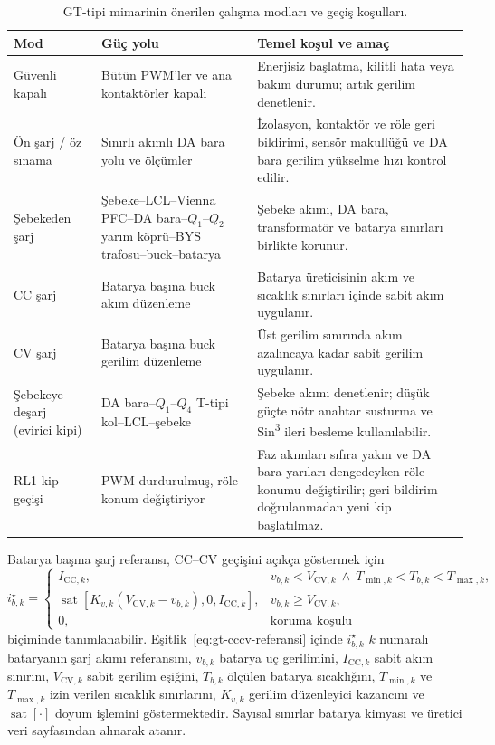 \begin{table}[H]
  \centering
  \caption{GT-tipi mimarinin önerilen çalışma modları ve geçiş koşulları.}
  \label{tab:gt-calisma-modlari}
  \small
  \begin{tabularx}{\textwidth}{@{}p{}p{}X@{}}
    \toprule
    Mod & Güç yolu & Temel koşul ve amaç \\
    \midrule
    Güvenli kapalı & Bütün PWM'ler ve ana kontaktörler kapalı & Enerjisiz başlatma, kilitli hata veya bakım durumu; artık gerilim denetlenir. \\
    Ön şarj / öz sınama & Sınırlı akımlı DA bara yolu ve ölçümler & İzolasyon, kontaktör ve röle geri bildirimi, sensör makullüğü ve DA bara gerilim yükselme hızı kontrol edilir. \\
    Şebekeden şarj & Şebeke--LCL--Vienna PFC--DA bara--$Q_1$--$Q_2$ yarım köprü--BYS trafosu--buck--batarya & Şebeke akımı, DA bara, transformatör ve batarya sınırları birlikte korunur. \\
    CC şarj & Batarya başına buck akım düzenleme & Batarya üreticisinin akım ve sıcaklık sınırları içinde sabit akım uygulanır. \\
    CV şarj & Batarya başına buck gerilim düzenleme & Üst gerilim sınırında akım azalıncaya kadar sabit gerilim uygulanır. \\
    Şebekeye deşarj (evirici kipi) & DA bara--$Q_1$--$Q_4$ T-tipi kol--LCL--şebeke & Şebeke akımı denetlenir; düşük güçte nötr anahtar susturma ve Sin\textsuperscript{3} ileri besleme kullanılabilir. \\
    RL1 kip geçişi & PWM durdurulmuş, röle konum değiştiriyor & Faz akımları sıfıra yakın ve DA bara yarıları dengedeyken röle konumu değiştirilir; geri bildirim doğrulanmadan yeni kip başlatılmaz. \\
    \bottomrule
  \end{tabularx}
\end{table}

Batarya başına şarj referansı, CC--CV geçişini açıkça göstermek için
\begin{equation}
  i_{b,k}^{\star}=
  \begin{cases}
    I_{\mathrm{CC},k}, & v_{b,k}<V_{\mathrm{CV},k}\ \land\ T_{\min,k}<T_{b,k}<T_{\max,k},\\
    \operatorname{sat}\!\left[K_{v,k}\left(V_{\mathrm{CV},k}-v_{b,k}\right),0,I_{\mathrm{CC},k}\right],
      & v_{b,k}\geq V_{\mathrm{CV},k},\\
    0, & \text{koruma koşulu}
  \end{cases}
  \label{eq:gt-cccv-referansi}
\end{equation}
biçiminde tanımlanabilir. Eşitlik~\eqref{eq:gt-cccv-referansi} içinde $i_{b,k}^{\star}$ $k$ numaralı bataryanın şarj akımı referansını, $v_{b,k}$ batarya uç gerilimini, $I_{\mathrm{CC},k}$ sabit akım sınırını, $V_{\mathrm{CV},k}$ sabit gerilim eşiğini, $T_{b,k}$ ölçülen batarya sıcaklığını, $T_{\min,k}$ ve $T_{\max,k}$ izin verilen sıcaklık sınırlarını, $K_{v,k}$ gerilim düzenleyici kazancını ve $\operatorname{sat}[\cdot]$ doyum işlemini göstermektedir. Sayısal sınırlar batarya kimyası ve üretici veri sayfasından alınarak atanır.

